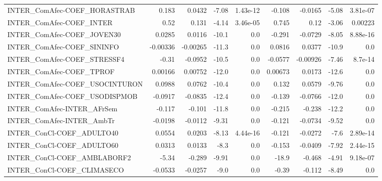 \begin{tabular}{lrrrrrrrr}
INTER\_ComAfec-COEF\_HORASTRAB           &       0.183 &       0.0432 &    -7.08 & 1.43e-12 &     -0.108 &     -0.0165 &        -5.08 &      3.81e-07 \\
INTER\_ComAfec-COEF\_INTER               &        0.52 &        0.131 &    -4.14 & 3.46e-05 &      0.745 &        0.12 &        -3.06 &       0.00223 \\
INTER\_ComAfec-COEF\_JOVEN30             &      0.0285 &       0.0116 &    -10.1 &      0.0 &     -0.291 &     -0.0729 &        -8.05 &      8.88e-16 \\
INTER\_ComAfec-COEF\_SININFO             &    -0.00336 &     -0.00265 &    -11.3 &      0.0 &     0.0816 &      0.0377 &        -10.9 &           0.0 \\
INTER\_ComAfec-COEF\_STRESSF4            &       -0.31 &      -0.0952 &    -10.5 &      0.0 &    -0.0577 &    -0.00926 &        -7.46 &       8.7e-14 \\
INTER\_ComAfec-COEF\_TPROF               &     0.00166 &      0.00752 &    -12.0 &      0.0 &    0.00673 &      0.0173 &        -12.6 &           0.0 \\
INTER\_ComAfec-COEF\_USOCINTURON         &      0.0988 &       0.0762 &    -10.4 &      0.0 &      0.132 &      0.0579 &        -9.76 &           0.0 \\
INTER\_ComAfec-COEF\_USODISPMOB          &     -0.0917 &      -0.0835 &    -12.4 &      0.0 &     -0.139 &     -0.0766 &        -12.0 &           0.0 \\
INTER\_ComAfec-INTER\_AFrSem             &      -0.117 &       -0.101 &    -11.8 &      0.0 &     -0.215 &      -0.238 &        -12.2 &           0.0 \\
INTER\_ComAfec-INTER\_AmbTr              &     -0.0198 &      -0.0112 &    -9.31 &      0.0 &     -0.121 &     -0.0734 &        -9.52 &           0.0 \\
INTER\_ConCl-COEF\_ADULTO40              &      0.0554 &       0.0203 &    -8.13 & 4.44e-16 &     -0.121 &     -0.0272 &         -7.6 &      2.89e-14 \\
INTER\_ConCl-COEF\_ADULTO60              &      0.0313 &       0.0133 &     -8.3 &      0.0 &     -0.153 &     -0.0409 &        -7.92 &      2.44e-15 \\
INTER\_ConCl-COEF\_AMBLABORF2            &       -5.34 &       -0.289 &    -9.91 &      0.0 &      -18.9 &      -0.468 &        -4.91 &      9.18e-07 \\
INTER\_ConCl-COEF\_CLIMASECO             &     -0.0533 &      -0.0257 &     -9.0 &      0.0 &      -0.39 &      -0.112 &        -8.49 &           0.0 \\

\end{tabular}
